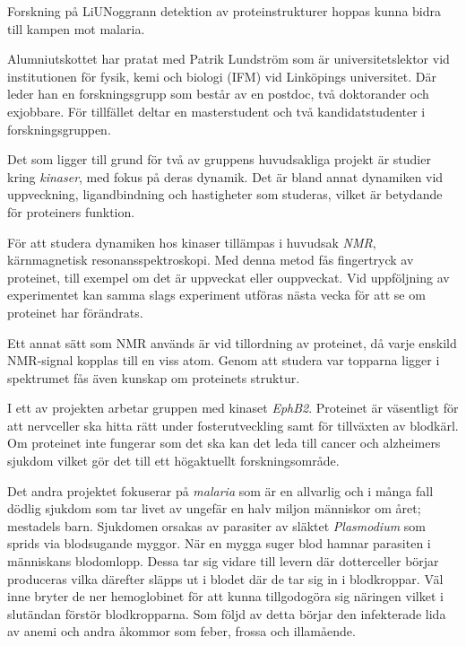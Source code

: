 \begin{news}{3}{Forskning på LiU}{Noggrann detektion av proteinstrukturer hoppas kunna bidra till kampen mot malaria.}{}{}


Alumniutskottet har pratat med Patrik Lundström som är universitetslektor vid institutionen för fysik, kemi och biologi (IFM) vid Linköpings universitet. Där leder han en forskningsgrupp som består av en postdoc, två doktorander och exjobbare. För tillfället deltar en masterstudent och två kandidatstudenter i forskningsgruppen. 

Det som ligger till grund för två av gruppens huvudsakliga projekt är studier kring \emph{kinaser}, med fokus på deras dynamik. Det är bland annat dynamiken vid uppveckning, ligandbindning och hastigheter som studeras, vilket är betydande för proteiners funktion. 

För att studera dynamiken hos kinaser tillämpas i huvudsak \emph{NMR}, kärnmagnetisk resonansspektroskopi. Med denna metod fås fingertryck av proteinet, till exempel om det är uppveckat eller ouppveckat. Vid uppföljning av experimentet kan samma slags experiment utföras nästa vecka för att se om proteinet har förändrats. 

Ett annat sätt som NMR används är vid tillordning av proteinet, då varje enskild NMR-signal kopplas till en viss atom. Genom att studera var topparna ligger i spektrumet fås även kunskap om proteinets struktur.  


I ett av projekten arbetar gruppen med kinaset \emph{EphB2}. Proteinet är väsentligt för att nervceller ska hitta rätt under fosterutveckling samt för tillväxten av blodkärl. Om proteinet inte fungerar som det ska kan det leda till cancer och alzheimers sjukdom vilket gör det till ett högaktuellt forskningsområde.

Det andra projektet fokuserar på \emph{malaria} som är en allvarlig och i många fall dödlig sjukdom som tar livet av ungefär en halv miljon människor om året; mestadels barn. Sjukdomen orsakas av parasiter av släktet \emph{Plasmodium} som sprids via blodsugande myggor. När en mygga suger blod hamnar parasiten i människans blodomlopp. Dessa tar sig vidare till levern där dotterceller börjar produceras vilka därefter släpps ut i blodet där de tar sig in i blodkroppar. Väl inne bryter de ner hemoglobinet för att kunna tillgodogöra sig näringen vilket i slutändan förstör blodkropparna. Som följd av detta börjar den infekterade lida av anemi och andra åkommor som feber, frossa och illamående. 


\end{news}

